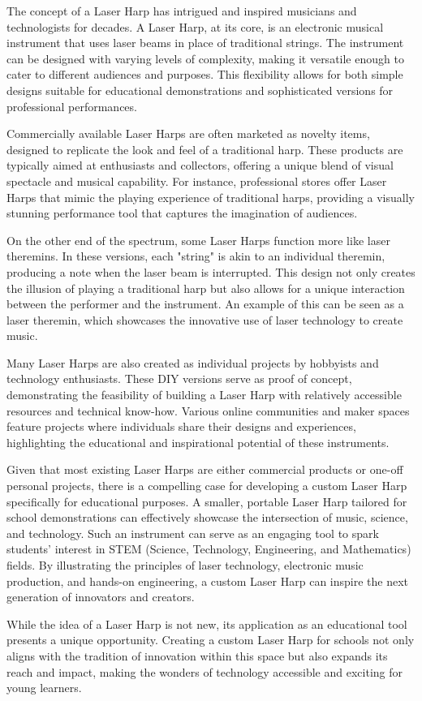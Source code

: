 The concept of a Laser Harp has intrigued and inspired musicians and technologists for decades. A Laser Harp, at its core, is an electronic musical instrument that uses laser beams in place of traditional strings. The instrument can be designed with varying levels of complexity, making it versatile enough to cater to different audiences and purposes. This flexibility allows for both simple designs suitable for educational demonstrations and sophisticated versions for professional performances.

Commercially available Laser Harps are often marketed as novelty items, designed to replicate the look and feel of a traditional harp. These products are typically aimed at enthusiasts and collectors, offering a unique blend of visual spectacle and musical capability. For instance, professional stores offer Laser Harps that mimic the playing experience of traditional harps,\cite{makezineLaserHarp} providing a visually stunning performance tool that captures the imagination of audiences.

On the other end of the spectrum, some Laser Harps function more like laser theremins.\cite{mountainglenharpsLaserHarps} In these versions, each "string" is akin to an individual theremin, producing a note when the laser beam is interrupted. This design not only creates the illusion of playing a traditional harp but also allows for a unique interaction between the performer and the instrument. An example of this can be seen as a laser theremin, which showcases the innovative use of laser technology to create music.

Many Laser Harps are also created as individual projects by hobbyists and technology enthusiasts.\cite{makezineBuildTwoOctave} These DIY versions serve as proof of concept, demonstrating the feasibility of building a Laser Harp with relatively accessible resources and technical know-how. Various online communities and maker spaces feature projects where individuals share their designs and experiences, highlighting the educational and inspirational potential of these instruments.

Given that most existing Laser Harps are either commercial products or one-off personal projects, there is a compelling case for developing a custom Laser Harp specifically for educational purposes. A smaller, portable Laser Harp tailored for school demonstrations can effectively showcase the intersection of music, science, and technology. Such an instrument can serve as an engaging tool to spark students' interest in STEM (Science, Technology, Engineering, and Mathematics) fields.\cite{youtubeLaserHarp} By illustrating the principles of laser technology, electronic music production, and hands-on engineering, a custom Laser Harp can inspire the next generation of innovators and creators.

While the idea of a Laser Harp is not new, its application as an educational tool presents a unique opportunity. Creating a custom Laser Harp for schools not only aligns with the tradition of innovation within this space but also expands its reach and impact, making the wonders of technology accessible and exciting for young learners.